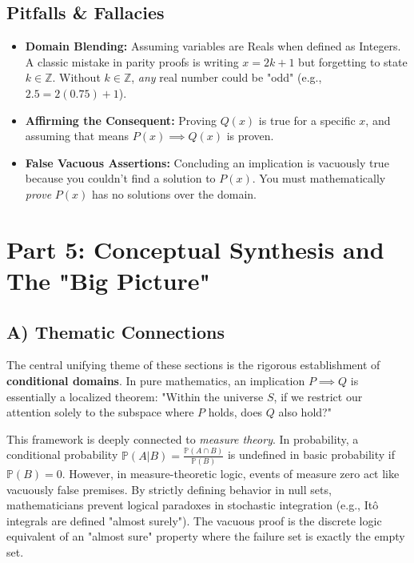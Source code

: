 \documentclass[11pt]{article}
\theoremstyle{remark}
\begin{document}
\subsection{Pitfalls \& Fallacies}
\begin{itemize}
    \item \textbf{Domain Blending:} Assuming variables are Reals when defined as Integers. A classic mistake in parity proofs is writing $x = 2k+1$ but forgetting to state $k \in \mathbb{Z}$. Without $k \in \mathbb{Z}$, \textit{any} real number could be "odd" (e.g., $2.5 = 2(0.75) + 1$).
    \item \textbf{Affirming the Consequent:} Proving $Q(x)$ is true for a specific $x$, and assuming that means $P(x) \implies Q(x)$ is proven. 
    \item \textbf{False Vacuous Assertions:} Concluding an implication is vacuously true because you couldn't find a solution to $P(x)$. You must mathematically \textit{prove} $P(x)$ has no solutions over the domain.
\end{itemize}

\newpage
\section{Part 5: Conceptual Synthesis and The "Big Picture"}

\subsection{A) Thematic Connections}
The central unifying theme of these sections is the rigorous establishment of \textbf{conditional domains}. In pure mathematics, an implication $P \implies Q$ is essentially a localized theorem: "Within the universe $S$, if we restrict our attention solely to the subspace where $P$ holds, does $Q$ also hold?" 

This framework is deeply connected to \textit{measure theory}. In probability, a conditional probability $\mathbb{P}(A | B) = \frac{\mathbb{P}(A \cap B)}{\mathbb{P}(B)}$ is undefined in basic probability if $\mathbb{P}(B) = 0$. However, in measure-theoretic logic, events of measure zero act like vacuously false premises. By strictly defining behavior in null sets, mathematicians prevent logical paradoxes in stochastic integration (e.g., Itô integrals are defined "almost surely"). The vacuous proof is the discrete logic equivalent of an "almost sure" property where the failure set is exactly the empty set.
\end{document}
